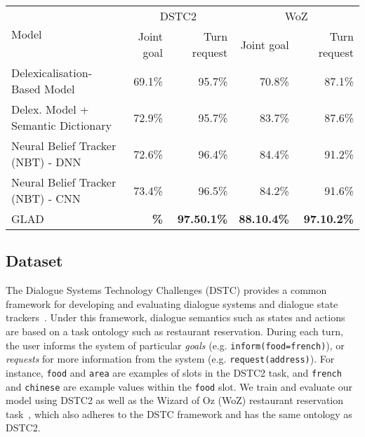 \documentclass[11pt,a4paper]{article}
\newcommand{\modelnameshort}{GLAD}
\newcommand{\goalacc}{88.1}
\newcommand{\requestacc}{97.1}
\newcommand{\goalstd}{0.4}
\newcommand{\requeststd}{0.2}
\newcommand{\dstcrequestacc}{97.5}
\newcommand{\dstcgoalstd}{0.2}
\newcommand{\dstcrequeststd}{0.1}
\begin{document}
\begin{table*}[t]
\centering
\begin{tabular}{lrrrr}
\toprule
\multirow{2}{*}{Model}                             & \multicolumn{2}{c}{DSTC2} & \multicolumn{2}{c}{WoZ} \\
                                                   & Joint goal   & Turn request  & Joint goal  & Turn request \\
\midrule
Delexicalisation-Based Model                       & 69.1\%       & 95.7\%         & 70.8\%      & 87.1\%        \\
Delex. Model + Semantic Dictionary                 & 72.9\%       & 95.7\%         & 83.7\%      & 87.6\%        \\
Neural Belief Tracker (NBT) - DNN                        & 72.6\%       & 96.4\%         & 84.4\%      & 91.2\%        \\
Neural Belief Tracker (NBT) - CNN                        & 73.4\%       & 96.5\%         & 84.2\%      & 91.6\%        \\
\modelnameshort                                         & \textbf{\dstcgoalacc  \dstcgoalstd\%}       & \textbf{\dstcrequestacc  \dstcrequeststd\%}         & \textbf{\goalacc  \goalstd\%}      & \textbf{\requestacc  \requeststd\%}        \\
\bottomrule
\end{tabular}
\caption{
Test accuracies on the DSTC2 and WoZ restaurant reservation datasets.
The other models are: delexicalisation DSTC2~\citep{henderson2014word}, delexicalisation WoZ~\citep{wen2017NetworkBasedEndToEndDialogueSystem}, and NBT~\citep{mrkvsic2016neural}.
We run 10 models using random seeds with early stopping on the development set, and report the mean and standard deviation test accuracies for each dataset.
}
\label{tb:result}
\vspace{-0.2cm}
\end{table*}





\subsection{Dataset}
The Dialogue Systems Technology Challenges (DSTC) provides a common framework for developing and evaluating dialogue systems and dialogue state trackers~\cite{dstc1,dstc2}.
Under this framework, dialogue semantics such as states and actions are based on a task ontology such as restaurant reservation.
During each turn, the user informs the system of particular \textit{goals} (e.g. \texttt{inform(food=french)}), or \textit{requests} for more information from the system (e.g. \texttt{request(address)}).
For instance, \texttt{food} and \texttt{area} are examples of slots in the DSTC2 task, and \texttt{french} and \texttt{chinese} are example values within the \texttt{food} slot.
We train and evaluate our model using DSTC2 as well as the Wizard of Oz (WoZ) restaurant reservation task~\cite{wen2017NetworkBasedEndToEndDialogueSystem}, which also adheres to the DSTC framework and has the same ontology as DSTC2.
\end{document}
